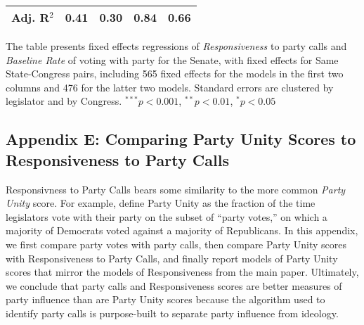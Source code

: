 \documentclass[12pt]{article}
\begin{document}
\begin{table}[!htbp]
\begin{threeparttable}
\begin{tabular}{l c c c c }
Adj. R$^2$%
                                  & 0.41        & 0.30     & 0.84        & 0.66         \\
\hline
\end{tabular}
\begin{tablenotes}
   \item
   The table presents fixed effects regressions of \textit{Responsiveness} to party calls and \textit {Baseline Rate} of voting with party for the Senate, with fixed effects for Same State-Congress pairs, including 565 fixed effects for the models in the first two columns and 476 for the latter two models.  Standard errors are clustered by legislator and by Congress.
   $^{***}p<0.001$, $^{**}p<0.01$, $^*p<0.05$
 \end{tablenotes}
\end{threeparttable}
\end{table}

\clearpage


\subsection*{Appendix E: Comparing Party Unity Scores to Responsiveness to Party Calls}
%

Responsivness to Party Calls bears some similarity to the more common
\emph{Party Unity} score.
For example, \cite{Carson:2010} define Party Unity as the fraction of the time
legislators vote with their party on the subset of ``party votes,'' on which a
majority of Democrats voted against a majority of Republicans.
In this appendix, we first compare party votes with party calls, then compare
Party Unity scores with Responsiveness to Party Calls, and finally report
models of Party Unity scores that mirror the models of Responsiveness from the
main paper.
Ultimately, we conclude that party calls and Responsiveness scores are
better measures of party influence than are Party Unity scores because the
algorithm used to identify party calls is purpose-built to separate party
influence from ideology.
\end{document}
